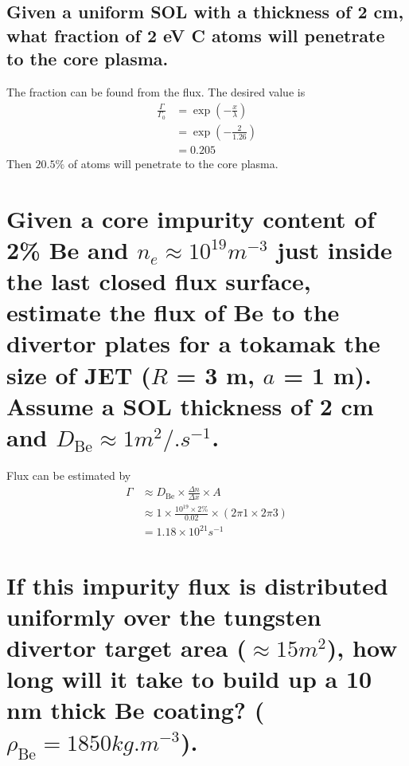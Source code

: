 \documentclass[answers]{exam}
\begin{document}
\begin{questions}
\begin{parts}
\part{Given a uniform SOL with a thickness of 2 cm, what fraction of 2 eV C atoms will penetrate to the core plasma.}

\begin{solution}
    The fraction can be found from the flux. The desired value is
    \begin{align*}
        \frac{\Gamma}{\Gamma_0} &= \exp\left(-\frac{x}{\lambda}\right) \\
                                &= \exp\left(-\frac{2}{1.26}\right) \\
                                &= 0.205
    \end{align*}
    Then $20.5\%$ of atoms will penetrate to the core plasma.
\end{solution}
\end{parts}

\question{}

\begin{parts}

\part{Given a core impurity content of 2\% Be and $n_e \approx 10^{19} \unit{m^{-3}}$ just inside the last closed flux surface, estimate the flux of Be to the divertor plates for a tokamak the size of JET ($R$ = 3 m, $a$ = 1 m). Assume a SOL thickness of 2 cm and $D_{\text{Be}} \approx 1 \unit{m^2/.s^{-1}}$.}

\begin{solution}
    Flux can be estimated by
    \begin{align*}
        \Gamma &\approx D_{\text{Be}} \times \frac{\Delta n}{\Delta x} \times A \\
               &\approx 1 \times \frac{10^{19}\times2\%}{0.02} \times (2\pi1\times2\pi3) \\
               &= 1.18 \times 10^{21} \unit{s^{-1}}
    \end{align*}
\end{solution}


\part{If this impurity flux is distributed uniformly over the tungsten divertor target area ($\approx 15 \unit{m^2}$), how long will it take to build up a 10 nm thick Be coating? ($\rho_{\text{Be}} = 1850 \unit{kg.m^{-3}}$).}


\end{parts}
\end{questions}
\end{document}

